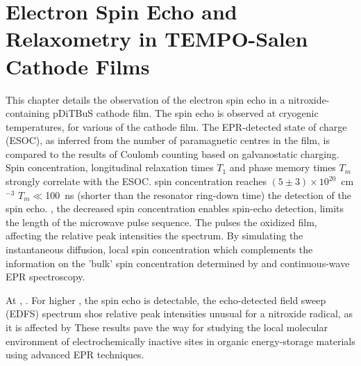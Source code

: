 \chapter{Electron Spin Echo and Relaxometry in TEMPO-Salen Cathode Films}
\label{ch:JMRO}


This chapter details the observation of the electron spin echo in a nitroxide-containing pDiTBuS cathode film. The spin echo is observed at cryogenic temperatures, for various  of the cathode film. The EPR-detected state of charge (ESOC), as inferred from the number of paramagnetic centres in the film, is compared to the results of Coulomb counting based on galvanostatic charging. Spin concentration, longitudinal relaxation times $T_1$ and phase memory times $T_m$ strongly correlate with the ESOC.   spin concentration reaches $\left(5\pm3\right)\times10^{20}$~cm$^{-3}$ $T_m\ll$100~ns (shorter than the resonator ring-down time)  the detection of the spin echo. , the decreased spin concentration    enables spin-echo detection,  limits the length of the microwave pulse sequence. The  pulses  the oxidized film, affecting the relative peak intensities  the  spectrum. By simulating the  instantaneous diffusion,  local spin concentration\q{,} which complements the information on the 'bulk' spin concentration determined by  and continuous-wave EPR spectroscopy.\\

\par
At , . For higher , the spin echo is detectable,  the echo-detected field sweep (EDFS) spectrum shos relative peak intensities unusual for a nitroxide radical, as it is affected by  These results pave the way for studying the local molecular environment of electrochemically inactive sites in organic energy-storage materials using advanced EPR techniques.

